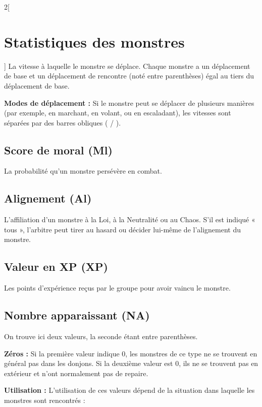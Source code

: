 \begin{multicols}{2}[\section*{Statistiques des monstres}\label{statistiques-des-monstres}]
La vitesse à laquelle le monstre se déplace. Chaque monstre a un
déplacement de base et un déplacement de rencontre (noté entre
parenthèses) égal au tiers du déplacement de base.

\textbf{Modes de déplacement :} Si le monstre peut se déplacer de
plusieurs manières (par exemple, en marchant, en volant, ou en
escaladant), les vitesses sont séparées par des barres obliques ( / ).

\subsection*{Score de moral (Ml)}\label{score-de-moral-ml}

La probabilité qu'un monstre persévère en combat.

\subsection*{Alignement (Al)}\label{alignement-al}

L'affiliation d'un monstre à la Loi, à la Neutralité ou au Chaos. S'il
est indiqué « tous », l'arbitre peut tirer au hasard ou décider lui-même
de l'alignement du monstre.

\subsection*{Valeur en XP (XP)}\label{valeur-en-xp-xp}

Les points d'expérience reçus par le groupe pour avoir vaincu le
monstre.

\subsection*{Nombre apparaissant (NA)}\label{nombre-apparaissant-na}

On trouve ici deux valeurs, la seconde étant entre parenthèses.

\textbf{Zéros :} Si la première valeur indique 0, les monstres de ce
type ne se trouvent en général pas dans les donjons. Si la deuxième
valeur est 0, ils ne se trouvent pas en extérieur et n'ont normalement
pas de repaire.

\textbf{Utilisation :} L'utilisation de ces valeurs dépend de la
situation dans laquelle les monstres sont rencontrés :


\end{multicols}
